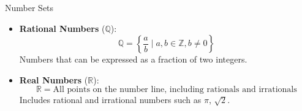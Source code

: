 \documentclass[aspectratio=169]{beamer}
\begin{document}
\begin{frame}{Number Sets}
\begin{itemize}
    \item \textbf{Rational Numbers} (\( \mathbb{Q} \)):\\
    \[
    \mathbb{Q} = \left\{ \frac{a}{b} \mid a, b \in \mathbb{Z}, b \neq 0 \right\}
    \]
    Numbers that can be expressed as a fraction of two integers.

    \item \textbf{Real Numbers} (\( \mathbb{R} \)):\\
    \[
    \mathbb{R} = \text{All points on the number line, including rationals and irrationals}
    \]
    Includes rational and irrational numbers such as \( \pi \), \( \sqrt{2} \).

\end{itemize}
\end{frame}
\end{document}
